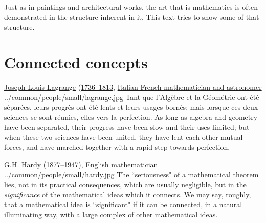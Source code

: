 Just as in paintings and architectural works,
the art that is mathematics is often demonstrated in the structure inherent in it.
This text tries to show some of that structure.

\section*{Connected concepts}

\qboxnpqt
  { \href{http://en.wikipedia.org/wiki/Joseph_Louis_Lagrange}{Joseph-Louis Lagrange}
    (\href{http://www-history.mcs.st-andrews.ac.uk/Timelines/TimelineD.html}{1736--1813},
     \href{http://www-history.mcs.st-andrews.ac.uk/BirthplaceMaps/Places/Italy.html}{Italian-French mathematician and astronomer}
    \footnotemark
  }
  {../common/people/small/lagrange.jpg}
  {Tant que l'Alg\`ebre et la G\'eom\'etrie ont \'et\'e s\'epar\'ees,
   leurs progr\`es ont \'et\'e lents et leurs usages born\'es;
   mais lorsque ces deux sciences se sont r\'eunies, elles vers la perfection.}
  {As long as algebra and geometry have been separated,
   their progress have been slow and their uses limited;
   but when these two sciences have been united, they have lent each other mutual forces,
   and have marched together with a rapid step towards perfection.
  }


\qboxnps
  {\href{http://en.wikipedia.org/wiki/G._H._Hardy}{G.H. Hardy}
   \href{http://www-history.mcs.st-andrews.ac.uk/Timelines/TimelineG.html}{(1877--1947)},
   \href{http://www-history.mcs.st-andrews.ac.uk/BirthplaceMaps/Places/UK.html}{English mathematician}
    \footnotemark
  }
  {../common/people/small/hardy.jpg}
  {The ``seriousness" of a mathematical theorem lies,
    not in its practical consequences,
    which are usually negligible,
    but in the {\em significance} of the mathematical ideas which it connects.
    We may say, roughly, that a mathematical idea is ``significant" if it can be
    connected, in a natural illuminating way,
    with a large complex of other mathematical ideas.}

